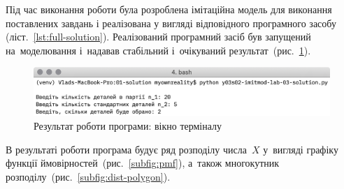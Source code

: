 \documentclass[
	a4paper,
	oneside,
	BCOR = 10mm,
	DIV = 12,
	12pt,
	headings = normal,
]{scrartcl}
\begin{document}
		Під час виконання роботи була розроблена імітаційна модель для виконання поставлених завдань і реалізована у вигляді відповідного програмного засобу (ліст.~\ref{lst:full-solution}). Реалізований програмний засіб був запущений на~моделювання і~надавав стабільний і~очікуваний результат~(рис.~\ref{fig:program_scr}).

		\begin{figure}[!htbp]
			\centering
			\includegraphics[height = 4\baselineskip]{./assets/y03s02-imitmod-lab-03-p00.png}
			\caption{Результат роботи програми: вікно терміналу}
			\label{fig:program_scr}
		\end{figure}

		В результаті роботи програма будує ряд розподілу числа~$X$ у~вигляді графіку функції ймовірностей~(рис.~\ref{subfig:pmf}), а~також многокутник розподілу~(рис.~\ref{subfig:dist-polygon}).
\end{document}
